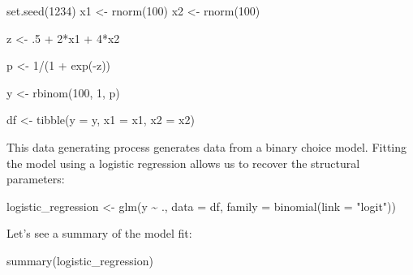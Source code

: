 \documentclass[
]{article}
\newenvironment{Shaded}{\begin{snugshade}}{\end{snugshade}}
\newcommand{\AttributeTok}[1]{\textcolor[rgb]{0.77,0.63,0.00}{#1}}
\newcommand{\DecValTok}[1]{\textcolor[rgb]{0.00,0.00,0.81}{#1}}
\newcommand{\FunctionTok}[1]{\textcolor[rgb]{0.00,0.00,0.00}{#1}}
\newcommand{\NormalTok}[1]{#1}
\newcommand{\OtherTok}[1]{\textcolor[rgb]{0.56,0.35,0.01}{#1}}
\newcommand{\SpecialCharTok}[1]{\textcolor[rgb]{0.00,0.00,0.00}{#1}}
\newcommand{\StringTok}[1]{\textcolor[rgb]{0.31,0.60,0.02}{#1}}
\begin{document}
\begin{Shaded}
\begin{Highlighting}[]
\FunctionTok{set.seed}\NormalTok{(}\DecValTok{1234}\NormalTok{)}
\NormalTok{x1 }\OtherTok{\textless{}{-}} \FunctionTok{rnorm}\NormalTok{(}\DecValTok{100}\NormalTok{)}
\NormalTok{x2 }\OtherTok{\textless{}{-}} \FunctionTok{rnorm}\NormalTok{(}\DecValTok{100}\NormalTok{)}
  
\NormalTok{z }\OtherTok{\textless{}{-}}\NormalTok{ .}\DecValTok{5} \SpecialCharTok{+} \DecValTok{2}\SpecialCharTok{*}\NormalTok{x1 }\SpecialCharTok{+} \DecValTok{4}\SpecialCharTok{*}\NormalTok{x2}

\NormalTok{p }\OtherTok{\textless{}{-}} \DecValTok{1}\SpecialCharTok{/}\NormalTok{(}\DecValTok{1} \SpecialCharTok{+} \FunctionTok{exp}\NormalTok{(}\SpecialCharTok{{-}}\NormalTok{z))}

\NormalTok{y }\OtherTok{\textless{}{-}} \FunctionTok{rbinom}\NormalTok{(}\DecValTok{100}\NormalTok{, }\DecValTok{1}\NormalTok{, p)}

\NormalTok{df }\OtherTok{\textless{}{-}} \FunctionTok{tibble}\NormalTok{(}\AttributeTok{y =}\NormalTok{ y, }\AttributeTok{x1 =}\NormalTok{ x1, }\AttributeTok{x2 =}\NormalTok{ x2)}
\end{Highlighting}
\end{Shaded}

This data generating process generates data from a binary choice model. Fitting the model using a
logistic regression allows us to recover the structural parameters:

\begin{Shaded}
\begin{Highlighting}[]
\NormalTok{logistic\_regression }\OtherTok{\textless{}{-}} \FunctionTok{glm}\NormalTok{(y }\SpecialCharTok{\textasciitilde{}}\NormalTok{ ., }\AttributeTok{data =}\NormalTok{ df, }\AttributeTok{family =} \FunctionTok{binomial}\NormalTok{(}\AttributeTok{link =} \StringTok{"logit"}\NormalTok{))}
\end{Highlighting}
\end{Shaded}

Let's see a summary of the model fit:

\begin{Shaded}
\begin{Highlighting}[]
\FunctionTok{summary}\NormalTok{(logistic\_regression)}
\end{Highlighting}
\end{Shaded}
\end{document}
